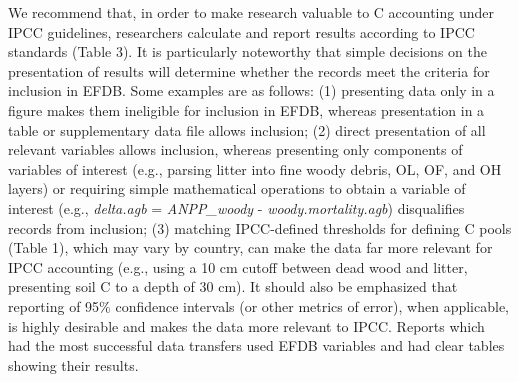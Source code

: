 \documentclass[, manuscript]{copernicus}
\begin{document}
We recommend that, in order to make research valuable to C accounting
under IPCC guidelines, researchers calculate and report results
according to IPCC standards (Table 3). It is particularly noteworthy
that simple decisions on the presentation of results will determine
whether the records meet the criteria for inclusion in EFDB. Some
examples are as follows: (1) presenting data only in a figure makes them
ineligible for inclusion in EFDB, whereas presentation in a table or
supplementary data file allows inclusion; (2) direct presentation of all
relevant variables allows inclusion, whereas presenting only components
of variables of interest (e.g., parsing litter into fine woody debris,
OL, OF, and OH layers) or requiring simple mathematical operations to
obtain a variable of interest (e.g., \emph{delta.agb} =
\emph{ANPP\_woody} - \emph{woody.mortality.agb}) disqualifies records
from inclusion; (3) matching IPCC-defined thresholds for defining C
pools (Table 1), which may vary by country, can make the data far more
relevant for IPCC accounting (e.g., using a 10 cm cutoff between dead
wood and litter, presenting soil C to a depth of 30 cm). It should also
be emphasized that reporting of 95\% confidence intervals (or other
metrics of error), when applicable, is highly desirable and makes the
data more relevant to IPCC. Reports which had the most successful data
transfers used EFDB variables and had clear tables showing their
results.
\end{document}
